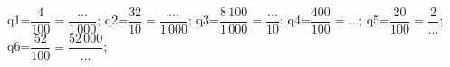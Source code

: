 \documentclass[exercice]{thedocument}%
\begin{document}
%
    \>q1=$\dfrac4{100}=\dfrac{...}{1\,000}$;%
    \>q2=$\dfrac{32}{10}=\dfrac{...}{1\,000}$;%
    \>q3=$\dfrac{8\,100}{1\,000}=\dfrac{...}{10}$;%
    \>q4=$\dfrac{400}{100}=...$;%
    \>q5=$\dfrac{20}{100}=\dfrac{2}{...}$;%
    \>q6=$\dfrac{52}{100}=\dfrac{52\,000}{...}$;%
\end{document}
